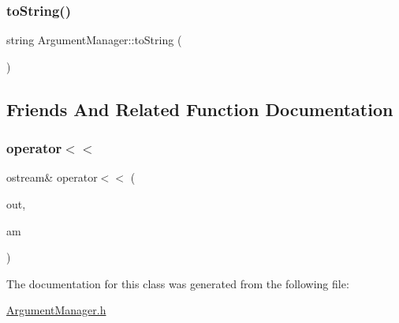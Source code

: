 \mbox{\label{class_argument_manager_aaede6a26bd07494cfd93be886de1fe9c}} 
\subsubsection{\texorpdfstring{to\+String()}{toString()}}
{\footnotesize\ttfamily string Argument\+Manager\+::to\+String (\begin{DoxyParamCaption}{ }\end{DoxyParamCaption})}



\subsection{Friends And Related Function Documentation}
\mbox{\label{class_argument_manager_aa33297e8cc199bd084f6427cd7031dd7}} 
\subsubsection{\texorpdfstring{operator$<$$<$}{operator<<}}
{\footnotesize\ttfamily ostream\& operator$<$$<$ (\begin{DoxyParamCaption}\item[{ostream \&}]{out,  }\item[{\mbox{\hyperlink{class_argument_manager}{Argument\+Manager}} \&}]{am }\end{DoxyParamCaption})\hspace{0.3cm}{\ttfamily [friend]}}



The documentation for this class was generated from the following file\+:\begin{DoxyCompactItemize}
\item 
\mbox{\hyperlink{_argument_manager_8h}{Argument\+Manager.\+h}}\end{DoxyCompactItemize}
